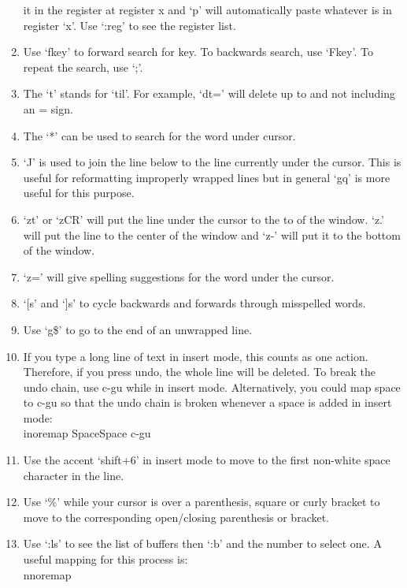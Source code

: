 \begin{enumerate}
        it in the register at register x and `p' will automatically paste
        whatever is in register `x'.  Use `:reg' to see the register list.
    \item Use `f\tlangle key\trangle' to forward search for \tlangle
        key\trangle. To backwards search, use `F\tlangle key\trangle'. To repeat
        the search, use `;'.
    \item The `t' stands for `til'. For example, `dt=' will delete up to and not
        including an = sign.  \item The `*' can be used to search for the word
        under cursor.
    \item `J' is used to join the line below to the line currently under the
        cursor. This is useful for reformatting improperly wrapped lines but in
        general `gq' is more useful for this purpose.
    \item `zt' or `z\tlangle CR\trangle' will put the line under the cursor to
        the to of the window. `z.' will put the line to the center of the window
        and `z-' will put it to the bottom of the window.
    \item `z=' will give spelling suggestions for the word under the cursor.
    \item `[s' and `]s' to cycle backwards and forwards through misspelled words.
    \item Use `g\$' to go to the end of an unwrapped line.
    \item If you type a long line of text in insert mode, this counts as one
        action. Therefore, if you press undo, the whole line will be deleted. To
        break the undo chain, use \tlangle c-g\trangle u while in insert mode.
        Alternatively, you could map space to \tlangle c-g\trangle u so that the
        undo chain is broken whenever a space is added in insert mode:\\
        inoremap \tlangle Space\trangle \tlangle Space\trangle \tlangle
        c-g\trangle u
    \item Use the accent `\tlangle shift+6\trangle' in insert mode to move to
        the first non-white space character in the line.
    \item Use `\%' while your cursor is over a parenthesis, square or curly
        bracket to move to the corresponding open/closing parenthesis or
        bracket.
    \item Use `:ls' to see the list of buffers then `:b' and the number to
        select one. A useful mapping for this process is:\\ nnoremap \tlangle

\end{enumerate}
